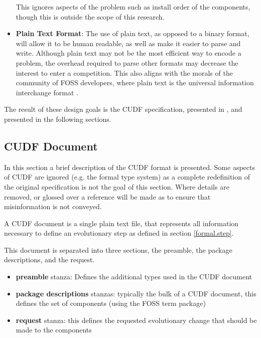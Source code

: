\begin{itemize}
  This ignores aspects of the problem such as install order of the components, though this is outside the scope of this research.
  \item \textbf{Plain Text Format}:
  The use of plain text, as opposed to a binary format, will allow it to be human readable, as well as make it easier to parse and write.
  Although plain text may not be the most efficient way to encode a problem, the overhead required to parse other formats may decrease the interest to enter a competition.
  This also aligns with the morals of the community of FOSS developers, where plain text is the universal information interchange format \citep{ray2003}.
\end{itemize}

The result of these design goals is the CUDF specification, presented in \cite{treinen2009common}, and presented in the following sections.

\subsection{CUDF Document}
In this section a brief description of the CUDF format is presented.
Some aspects of CUDF are ignored (e.g. the formal type system) as a complete redefinition of the original specification is not the goal of this section.
Where details are removed, or glossed over a reference will be made as to ensure that misinformation is not conveyed. 

A CUDF document is a single plain text file, that represents all information necessary to define an evolutionary step as defined in section \ref{formal.step}.

This document is separated into three sections, the preamble, the package descriptions, and the request.

\begin{itemize}
  \item \textbf{preamble} stanza: Defines the additional types used in the CUDF document
  \item \textbf{package descriptions} stanzas: typically the bulk of a CUDF document, this defines the set of components (using the FOSS term package)
  \item \textbf{request} stanza: this defines the requested evolutionary change that should be made to the components 
\end{itemize}

